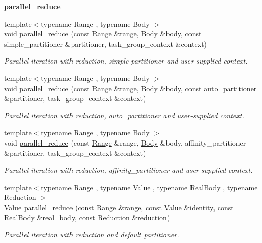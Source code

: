 \begin{Indent}{\bf parallel\+\_\+reduce}
\begin{DoxyCompactItemize}
{\footnotesize template$<$typename Range , typename Body $>$ }\\void \hyperlink{group__algorithms_gac57281bea03450ccb2d098ee8c7ab697}{parallel\+\_\+reduce} (const \hyperlink{classtbb_1_1blocked__range}{Range} \&range, \hyperlink{classBody}{Body} \&body, const simple\+\_\+partitioner \&partitioner, task\+\_\+group\+\_\+context \&context)
\begin{DoxyCompactList}\small\item\em Parallel iteration with reduction, simple partitioner and user-\/supplied context. \end{DoxyCompactList}\item 
{\footnotesize template$<$typename Range , typename Body $>$ }\\void \hyperlink{group__algorithms_ga5f3ebf50ab7f5e53fd936817c866f7be}{parallel\+\_\+reduce} (const \hyperlink{classtbb_1_1blocked__range}{Range} \&range, \hyperlink{classBody}{Body} \&body, const auto\+\_\+partitioner \&partitioner, task\+\_\+group\+\_\+context \&context)
\begin{DoxyCompactList}\small\item\em Parallel iteration with reduction, auto\+\_\+partitioner and user-\/supplied context. \end{DoxyCompactList}\item 
{\footnotesize template$<$typename Range , typename Body $>$ }\\void \hyperlink{group__algorithms_ga5df3f3a9618fd35931107819cb43fce6}{parallel\+\_\+reduce} (const \hyperlink{classtbb_1_1blocked__range}{Range} \&range, \hyperlink{classBody}{Body} \&body, affinity\+\_\+partitioner \&partitioner, task\+\_\+group\+\_\+context \&context)
\begin{DoxyCompactList}\small\item\em Parallel iteration with reduction, affinity\+\_\+partitioner and user-\/supplied context. \end{DoxyCompactList}\item 
{\footnotesize template$<$typename Range , typename Value , typename Real\+Body , typename Reduction $>$ }\\\hyperlink{structValue}{Value} \hyperlink{group__algorithms_ga1c9b66fa25cadee9ca3bff75a6609b05}{parallel\+\_\+reduce} (const \hyperlink{classtbb_1_1blocked__range}{Range} \&range, const \hyperlink{structValue}{Value} \&identity, const Real\+Body \&real\+\_\+body, const Reduction \&reduction)
\begin{DoxyCompactList}\small\item\em Parallel iteration with reduction and default partitioner. \end{DoxyCompactList}\item 

\end{DoxyCompactItemize}
\end{Indent}
